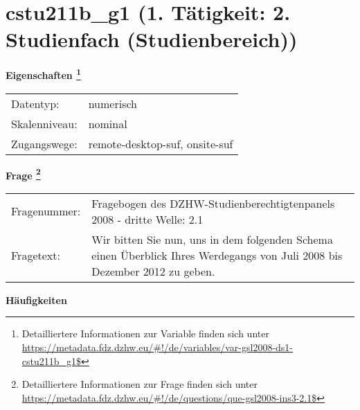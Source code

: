
    \setcounter{footnote}{0}

    \vspace*{-1.8cm}
	\section{cstu211b\_g1 (1. Tätigkeit: 2. Studienfach (Studienbereich))}
	\label{section:cstu211b_g1}



    \vspace*{0.5cm}
    \noindent\textbf{Eigenschaften
	\footnote{Detailliertere Informationen zur Variable finden sich unter
		\url{https://metadata.fdz.dzhw.eu/\#!/de/variables/var-gsl2008-ds1-cstu211b_g1$}}}\\
	\begin{tabularx}{\hsize}{@{}lX}
	Datentyp: & numerisch \\
	Skalenniveau: & nominal \\
	Zugangswege: &
	  remote-desktop-suf, 
	  onsite-suf
 \\
    \end{tabularx}



				\vspace*{0.5cm}
                \noindent\textbf{Frage
	                \footnote{Detailliertere Informationen zur Frage finden sich unter
		              \url{https://metadata.fdz.dzhw.eu/\#!/de/questions/que-gsl2008-ins3-2.1$}}}\\
				\begin{tabularx}{\hsize}{@{}lX}
					Fragenummer: &
					  Fragebogen des DZHW-Studienberechtigtenpanels 2008 - dritte Welle:
					  2.1
 \\
					Fragetext: & Wir bitten Sie nun, uns in dem folgenden Schema einen Überblick Ihres Werdegangs von Juli 2008 bis Dezember 2012 zu geben. \\
				\end{tabularx}





        		\vspace*{0.5cm}
                \noindent\textbf{Häufigkeiten}

